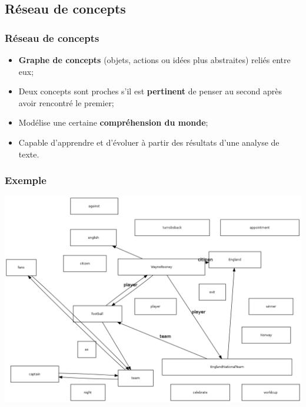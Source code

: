 \documentclass{beamer}
\begin{document}
    \subsection{Réseau de concepts}
        \begin{frame}
        \frametitle{Réseau de concepts}
            \begin{itemize}
                \item \textbf{Graphe de concepts} (objets, actions ou idées plus abstraites) reliés entre eux;
                \item Deux concepts sont proches s'il est \textbf{pertinent} de penser au second après avoir rencontré le premier;
                \item Modélise une certaine \textbf{compréhension du monde};
                \item Capable d'apprendre et d'évoluer à partir des résultats d'une analyse de texte.
            \end{itemize}
        \end{frame}

        \begin{frame}
        \frametitle{Exemple}
            \includegraphics[height=0.8\textheight]{RC/figures/RCetape0.png}
        \end{frame}
\end{document}
